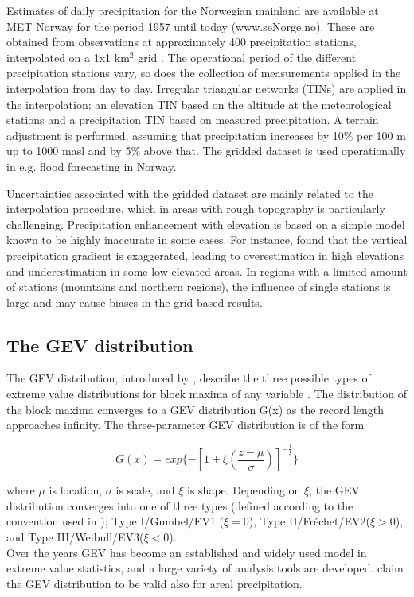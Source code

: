 \documentclass[12pt,a4paper,english]{article}
\begin{document}
Estimates of daily precipitation for the Norwegian mainland are available at MET Norway for the period 1957 until today (www.seNorge.no). These are obtained from observations at approximately 400 precipitation stations, interpolated on a 1x1 km$^2$ grid \citep{Tveitoetal2005, Mohr2009, Janssonetal2007}. The operational period of the different precipitation stations vary, so does the collection of measurements applied in the interpolation from day to day. Irregular triangular networks (TINs) are applied in the interpolation; an elevation TIN based on the altitude at the meteorological stations and a precipitation TIN based on measured precipitation. A terrain adjustment is performed, assuming that precipitation increases by 10\% per 100 m up to 1000 masl and by 5\% above that. The gridded dataset is used operationally in e.g. flood forecasting in Norway.  

Uncertainties associated with the gridded dataset are mainly related to the interpolation procedure, which in areas with rough topography is particularly challenging. Precipitation enhancement with elevation is based on a simple model known to be highly inaccurate in some cases. For instance, \cite{Engesetetal2004b, Saloranta2012} found that the vertical precipitation gradient is exaggerated, leading to overestimation in high elevations and underestimation in some low elevated areas. In regions with a limited amount of stations (mountains and northern regions), the influence of single stations is large and may cause biases in the grid-based results.\\
 

\subsection{The GEV distribution}

The GEV distribution, introduced by \cite{Jenkinson1955}, describe the three possible types of extreme value distributions for block maxima of any variable \citep{Coles2001}. The distribution of the block maxima converges to a GEV distribution G(x) as the record length approaches infinity. The three-parameter GEV distribution is of the form 

\begin{equation}
G(x) = exp\{ - [1 + \xi(\frac{z - \mu}{\sigma})]^{-\frac{1}{\xi}}\}  
\end{equation}

\noindent where $\mu$ is location, $\sigma$ is scale, and $\xi$ is shape. Depending on $\xi$, the GEV distribution converges into one of three types (defined according to the convention used in \cite{Coles2001}); Type I/Gumbel/EV1 ($\xi=0$), Type II/Fr\'echet/EV2($\xi>0$), and Type III/Weibull/EV3($\xi<0$). \\
Over the years GEV has become an established and widely used model in extreme value statistics, and a large variety of analysis tools are developed. \cite{ColesandTawn1996} claim the GEV distribution to be valid also for areal precipitation. 
\end{document}
